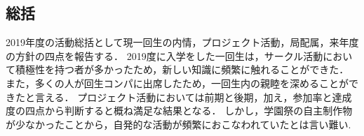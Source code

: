 \subsection*{\firstGrade{}総括}




2019年度の活動総括として現一回生の内情，プロジェクト活動，局配属，来年度の方針の四点を報告する．
2019度に入学をした一回生は，サークル活動において積極性を持つ者が多かったため，新しい知識に頻繁に触れることができた．
また，多くの人が回生コンパに出席したため，一回生内の親睦を深めることができたと言える．
プロジェクト活動においては前期と後期，加え，参加率と達成度の四点から判断すると概ね満足な結果となる．
しかし，学園祭の自主制作物が少なかったことから，自発的な活動が頻繁におこなわれていたとは言い難い.

